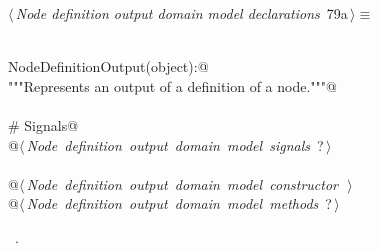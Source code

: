 \documentclass[
    a4paper,      %
    10pt,         %
    openright,    %
    notitlepage,  %
    parskip=half, %
]{scrreprt}       %
\theoremstyle{definition}                    %
\begin{document}
\begin{flushleft} \small
\begin{minipage}{\linewidth}\label{scrap128}\raggedright\small
{} $\langle\,${\itshape Node definition output domain model declarations}\nobreak\ {\footnotesize {79a}}$\,\rangle\equiv$
\vspace{-1exm}
\begin{list}{}{} \item
\mbox{}\lstinline@@\\
\mbox{}\lstinline@class NodeDefinitionOutput(object):@\\
\mbox{}\lstinline@    """Represents an output of a definition of a node."""@\\
\mbox{}\lstinline@@\\
\mbox{}\lstinline@    # Signals@\\
\mbox{}\lstinline@    @\hbox{$\langle\,${\itshape Node definition output domain model signals}\nobreak\ {\footnotesize ?}$\,\rangle$}\lstinline@@\\
\mbox{}\lstinline@@\\
\mbox{}\lstinline@    @\hbox{$\langle\,${\itshape Node definition output domain model constructor}\nobreak\ {\footnotesize {}}$\,\rangle$}\lstinline@@\\
\mbox{}\lstinline@    @\hbox{$\langle\,${\itshape Node definition output domain model methods}\nobreak\ {\footnotesize ?}$\,\rangle$}\lstinline@@{\NWsep}
\end{list}
\vspace{-1.5ex}
\footnotesize
\begin{list}{}{\setlength{\itemsep}{-\parsep}\setlength{\itemindent}{-\leftmargin}}
\item \NWtxtMacroRefIn\ .

\item{}
\end{list}
\end{minipage}\vspace{4ex}
\end{flushleft}
\end{document}
